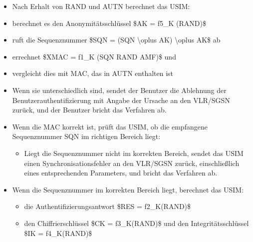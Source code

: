 \documentclass[a4paper]{article}
\begin{document}
\begin{multicols}{3}
\begin{itemize}
              \begin{itemize}
                  \item
                        Nach Erhalt von RAND und AUTN berechnet das USIM:
                  \item
                        berechnet es den Anonymitätsschlüssel \$AK = f5\_K (RAND)\$
                  \item
                        ruft die Sequenznummer \$SQN = (SQN \textbackslash oplus AK)
                        \textbackslash oplus AK\$ ab
                  \item
                        errechnet \$XMAC = f1\_K (SQN \textbar\textbar{} RAND
                        \textbar\textbar{} AMF)\$ und
                  \item
                        vergleicht dies mit MAC, das in AUTN enthalten ist
                  \item
                        Wenn sie unterschiedlich sind, sendet der Benutzer die Ablehnung der
                        Benutzerauthentifizierung mit Angabe der Ursache an den VLR/SGSN
                        zurück, und der Benutzer bricht das Verfahren ab.
                  \item
                        Wenn die MAC korrekt ist, prüft das USIM, ob die empfangene
                        Sequenznummer SQN im richtigen Bereich liegt:

                        \begin{itemize}
                            \item
                                  Liegt die Sequenznummer nicht im korrekten Bereich, sendet das
                                  USIM einen Synchronisationsfehler an den VLR/SGSN zurück,
                                  einschließlich eines entsprechenden Parameters, und bricht das
                                  Verfahren ab.
                        \end{itemize}
                  \item
                        Wenn die Sequenznummer im korrekten Bereich liegt, berechnet das
                        USIM:

                        \begin{itemize}
                            \item
                                  die Authentifizierungsantwort \$RES = f2\_K(RAND)\$
                            \item
                                  den Chiffrierschlüssel \$CK = f3\_K(RAND)\$ und den
                                  Integritätsschlüssel \$IK = f4\_K(RAND)\$
                        \end{itemize}
              \end{itemize}
    \end{itemize}



\end{multicols}
\end{document}

